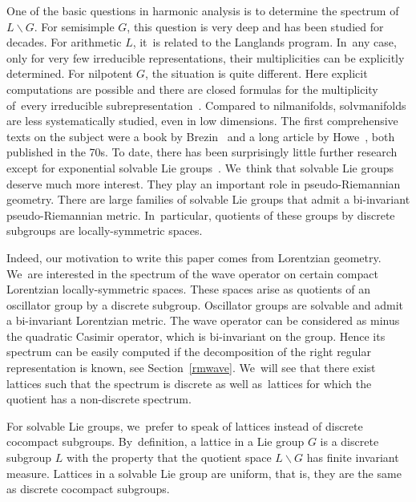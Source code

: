 \documentclass[pdftex]{sigma}
\numberwithin{equation}{section}
\begin{document}
One of the basic questions in harmonic analysis is to determine the spectrum of~$L\backslash G$. For semisimple $G$, this question is very deep and has been studied for decades. For arithmetic $L$, it~is related to the Langlands program. In~any case, only for very few irreducible representations, their multiplicities can be explicitly determined. For nilpotent $G$, the situation is quite different. Here explicit computations are possible and there are closed formulas for the multiplicity of~every irreducible subrepresentation~\cite{CG, H71, R71}. Compared to nilmanifolds, solvmanifolds are less systematically studied, even in low dimensions. The first comprehensive texts on the subject were a book by Brezin~\cite{Br} and a long article by Howe~\cite{Ho77}, both published in the 70s. To date, there has been surprisingly little further research except for exponential solvable Lie groups~\cite{FL}. We~think that solvable Lie groups deserve much more interest. They play an important role in pseudo-Riemannian geometry. There are large families of solvable Lie groups that admit a bi-invariant pseudo-Riemannian metric. In~particular, quotients of these groups by discrete subgroups are locally-symmetric spaces.

Indeed, our motivation to write this paper comes from Lorentzian geometry. We~are interested in the spectrum of the wave operator on certain compact Lorentzian locally-symmetric spaces. These spaces arise as quotients of an oscillator group by a discrete subgroup. Oscillator groups are solvable and admit a bi-invariant Lorentzian metric. The wave operator can be considered as minus the quadratic Casimir operator, which is bi-invariant on the group. Hence its spectrum can be easily computed if the decomposition of the right regular representation is known, see Section~\ref{rmwave}. We~will see that there exist lattices such that the spectrum is discrete as well as~lattices for which the quotient has a non-discrete spectrum.

For solvable Lie groups, we~prefer to speak of lattices instead of discrete cocompact subgroups. By~definition, a lattice in a Lie group $G$ is a discrete subgroup $L$ with the property that the quotient space $L\backslash G$ has finite invariant measure. Lattices in a solvable Lie group are uniform, that is, they are the same as discrete cocompact subgroups.
\end{document}
